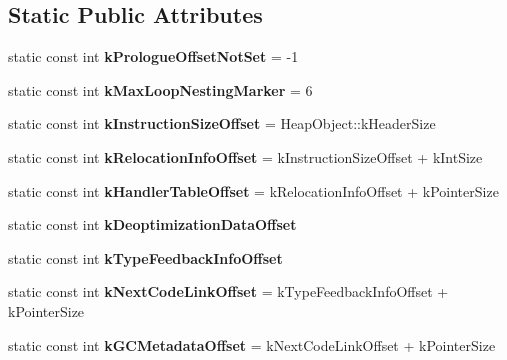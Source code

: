 \subsection*{Static Public Attributes}
\begin{DoxyCompactItemize}
\item 
\hypertarget{classv8_1_1internal_1_1_code_af29d8cba6d0ad254e8495cf93f3eb17f}{}static const int {\bfseries k\+Prologue\+Offset\+Not\+Set} = -\/1\label{classv8_1_1internal_1_1_code_af29d8cba6d0ad254e8495cf93f3eb17f}

\item 
\hypertarget{classv8_1_1internal_1_1_code_af68a87cf29bd9a110d9daedc1fcfd349}{}static const int {\bfseries k\+Max\+Loop\+Nesting\+Marker} = 6\label{classv8_1_1internal_1_1_code_af68a87cf29bd9a110d9daedc1fcfd349}

\item 
\hypertarget{classv8_1_1internal_1_1_code_a3e586e823b9236fabe55611465c30846}{}static const int {\bfseries k\+Instruction\+Size\+Offset} = Heap\+Object\+::k\+Header\+Size\label{classv8_1_1internal_1_1_code_a3e586e823b9236fabe55611465c30846}

\item 
\hypertarget{classv8_1_1internal_1_1_code_abc5dee556e430a443fa8e9740a68b5dc}{}static const int {\bfseries k\+Relocation\+Info\+Offset} = k\+Instruction\+Size\+Offset + k\+Int\+Size\label{classv8_1_1internal_1_1_code_abc5dee556e430a443fa8e9740a68b5dc}

\item 
\hypertarget{classv8_1_1internal_1_1_code_a63498b53776675a50af64ed19375a581}{}static const int {\bfseries k\+Handler\+Table\+Offset} = k\+Relocation\+Info\+Offset + k\+Pointer\+Size\label{classv8_1_1internal_1_1_code_a63498b53776675a50af64ed19375a581}

\item 
static const int {\bfseries k\+Deoptimization\+Data\+Offset}
\item 
static const int {\bfseries k\+Type\+Feedback\+Info\+Offset}
\item 
\hypertarget{classv8_1_1internal_1_1_code_a17ceb66548832c3a579cac433ce5d8c8}{}static const int {\bfseries k\+Next\+Code\+Link\+Offset} = k\+Type\+Feedback\+Info\+Offset + k\+Pointer\+Size\label{classv8_1_1internal_1_1_code_a17ceb66548832c3a579cac433ce5d8c8}

\item 
\hypertarget{classv8_1_1internal_1_1_code_afaea58c28ff9bb0fc3090025bc6682b8}{}static const int {\bfseries k\+G\+C\+Metadata\+Offset} = k\+Next\+Code\+Link\+Offset + k\+Pointer\+Size\label{classv8_1_1internal_1_1_code_afaea58c28ff9bb0fc3090025bc6682b8}


\end{DoxyCompactItemize}
